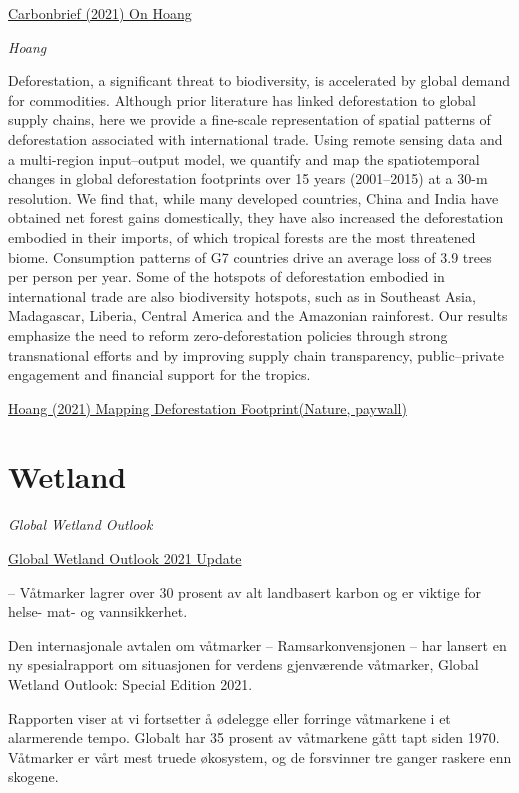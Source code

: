 \documentclass[
]{book}
\begin{document}
\href{https://www.carbonbrief.org/scientists-calculate-trade-related-deforestation-footprint-of-rich-countries}{Carbonbrief (2021) On Hoang}

\emph{Hoang}

Deforestation, a significant threat to biodiversity, is accelerated by global demand for commodities. Although prior literature has linked deforestation to global supply chains, here we provide a fine-scale representation of spatial patterns of deforestation associated with international trade. Using remote sensing data and a multi-region input--output model, we quantify and map the spatiotemporal changes in global deforestation footprints over 15 years (2001--2015) at a 30-m resolution. We find that, while many developed countries, China and India have obtained net forest gains domestically, they have also increased the deforestation embodied in their imports, of which tropical forests are the most threatened biome. Consumption patterns of G7 countries drive an average loss of 3.9 trees per person per year. Some of the hotspots of deforestation embodied in international trade are also biodiversity hotspots, such as in Southeast Asia, Madagascar, Liberia, Central America and the Amazonian rainforest. Our results emphasize the need to reform zero-deforestation policies through strong transnational efforts and by improving supply chain transparency, public--private engagement and financial support for the tropics.

\href{https://www.nature.com/articles/s41559-021-01417-z}{Hoang (2021) Mapping Deforestation Footprint(Nature, paywall)}

\hypertarget{wetland}{%
\section{Wetland}\label{wetland}}

\emph{Global Wetland Outlook}

\href{https://www.global-wetland-outlook.ramsar.org/outlook}{Global Wetland Outlook 2021 Update}

-- Våtmarker lagrer over 30 prosent av alt landbasert karbon og er viktige for helse- mat- og vannsikkerhet.

Den internasjonale avtalen om våtmarker -- Ramsarkonvensjonen -- har lansert en ny spesialrapport om situasjonen for verdens gjenværende våtmarker, Global Wetland Outlook: Special Edition 2021.

Rapporten viser at vi fortsetter å ødelegge eller forringe våtmarkene i et alarmerende tempo. Globalt har 35 prosent av våtmarkene gått tapt siden 1970. Våtmarker er vårt mest truede økosystem, og de forsvinner tre ganger raskere enn skogene.
\end{document}
